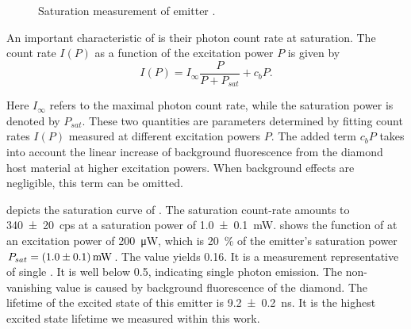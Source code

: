 		
		\begin{figure}[!htb]
			\centering
			\caption[Saturation measurement of an emitter]{Saturation measurement of emitter \embroad.}
			\label{fig::sat_Ir8}
		\end{figure}

		An important characteristic of \spss is their photon count rate at saturation. The count rate $I(P)$ as a function of the excitation power $P$ is given by
		\begin{equation}
			I(P) = I_{\infty} \frac{P}{P + P_{sat}} + c_b P.
		\end{equation}

		Here $I_{\infty}$ refers to the maximal photon count rate, while the saturation power is denoted by $P_{sat}$. These two quantities are parameters determined by fitting count rates $I(P)$ measured at different excitation powers $P$. The added term $c_b P$ takes into account the linear increase of background fluorescence from the diamond host material at higher excitation powers. When background effects are negligible, this term can be omitted.

		 depicts the saturation curve of \embroad.
		The saturation count-rate amounts to \SI[separate-uncertainty]{340\pm20}{cps} at a saturation power of \SI[separate-uncertainty]{1.0\pm0.1}{mW}.
		 shows the \gt function of \embroad at an excitation power of \SI{200}{\micro\W}, which is \SI{20}{\percent} of the emitter's saturation power $P_{sat}=\SI[separate-uncertainty]{1.0\pm0.1}{mW}$.
		The \gtz value yields \num{0.16}.
		It is a \gt measurement representative of single \sivs.
		It is well below \num{0.5}, indicating single photon emission.
		The non-vanishing \gtz value is caused by background fluorescence of the diamond.
		The lifetime of the excited state of this emitter is \SI[separate-uncertainty]{9.2\pm0.2}{ns}.
		It is the highest excited state lifetime we measured within this work.
		
